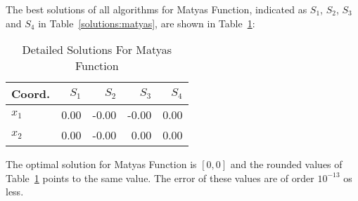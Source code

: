 
The best solutions of all algorithms for Matyas Function, indicated as
$S_{1}$, $S_{2}$, $S_{3}$ and $S_{4}$ in Table~\ref{solutions:matyas}, are shown
in Table~\ref{detailedsolutions:matyas}:

\begin{table}[H]
\centering
\caption{Detailed Solutions For Matyas Function}
\label{detailedsolutions:matyas}
\begin{tabular}{lrrrr}
\toprule
 Coord. &  $S_{1}$ &  $S_{2}$ &  $S_{3}$ &  $S_{4}$ \\
\midrule
$x_{1}$ &     0.00 &    -0.00 &    -0.00 &     0.00 \\
$x_{2}$ &     0.00 &    -0.00 &     0.00 &     0.00 \\
\bottomrule
\end{tabular}
\end{table}

The optimal solution for Matyas Function is $\left[0, 0\right]$ and the rounded values
of Table~\ref{detailedsolutions:matyas} points to the same value. The error of
these values are of order $10^{-13}$ os less.